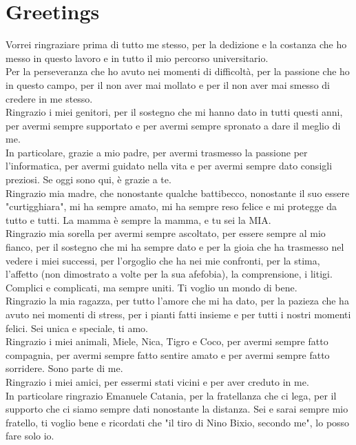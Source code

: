 \chapter*{Greetings}

Vorrei ringraziare prima di tutto me stesso, per la dedizione e la costanza che ho messo in questo lavoro e in tutto il mio percorso universitario.
\\Per la perseveranza che ho avuto nei momenti di difficoltà, per la passione che ho in questo campo, per il non aver mai mollato e per il non aver mai smesso di credere in me stesso.
\\Ringrazio i miei genitori, per il sostegno che mi hanno dato in tutti questi anni, per avermi sempre supportato e per avermi sempre spronato a dare il meglio di me.
\\In particolare, grazie a mio padre, per avermi trasmesso la passione per l'informatica, per avermi guidato nella vita e per avermi sempre dato consigli preziosi. Se oggi sono qui, è grazie a te.
\\Ringrazio mia madre, che nonostante qualche battibecco, nonostante il suo essere "curtigghiara", mi ha sempre amato, mi ha sempre reso felice e mi protegge da tutto e tutti. La mamma è sempre la mamma, e tu sei la MIA.
\\Ringrazio mia sorella per avermi sempre ascoltato, per essere sempre al mio fianco, per il sostegno che mi ha sempre dato e per la gioia che ha trasmesso nel vedere i miei successi, per l'orgoglio che ha nei mie confronti, per la stima, l'affetto (non dimostrato a volte per la sua afefobia), la comprensione, i litigi.
Complici e complicati, ma sempre uniti. Ti voglio un mondo di bene.
\\Ringrazio la mia ragazza, per tutto l'amore che mi ha dato, per la pazieza che ha avuto nei momenti di stress, per i pianti fatti insieme e per tutti i nostri momenti felici. Sei unica e speciale, ti amo.
\\Ringrazio i miei animali, Miele, Nica, Tigro e Coco, per avermi sempre fatto compagnia, per avermi sempre fatto sentire amato e per avermi sempre fatto sorridere. Sono parte di me.
\\Ringrazio i miei amici, per essermi stati vicini e per aver creduto in me.
\\In particolare ringrazio Emanuele Catania, per la fratellanza che ci lega, per il supporto che ci siamo sempre dati nonostante la distanza. Sei e sarai sempre mio fratello, ti voglio bene e ricordati che "il tiro di Nino Bixio, secondo me", lo posso fare solo io.
